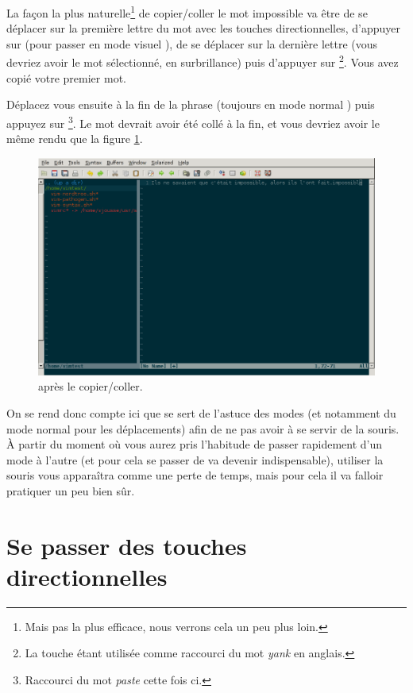La façon la plus naturelle\footnote{Mais pas la plus efficace, nous verrons cela un peu plus loin.} de copier/coller le mot \og impossible \fg{} va être de se déplacer sur la première lettre du mot avec les touches directionnelles, d'appuyer sur \ttv (pour passer en mode \og visuel \fg), de se déplacer sur la dernière lettre (vous devriez avoir le mot sélectionné, en surbrillance) puis d'appuyer sur \tty\footnote{La touche \ty étant utilisée comme raccourci du mot \emph{yank} en anglais.}. Vous avez copié votre premier mot.

Déplacez vous ensuite à la fin de la phrase (toujours en mode \og normal \fg) puis appuyez sur \ttp\footnote{Raccourci du mot \emph{paste} cette fois ci.}. Le mot devrait avoir été collé à la fin, et vous devriez avoir le même rendu que la figure \ref{fig:vim-paste}.

\begin{figure}%
  \includegraphics[width=\linewidth]{graphics/vim-paste.png}
  \caption{\vim après le copier/coller.}
  \label{fig:vim-paste}
\end{figure}

On se rend donc compte ici que \vim se sert de l'astuce des modes (et notamment du mode \og normal \fg{} pour les déplacements) afin de ne pas avoir à se servir de la souris.
À partir du moment où vous aurez pris l'habitude de passer rapidement d'un mode à l'autre (et pour cela se passer de \ttesc va devenir indispensable), utiliser la souris vous apparaîtra comme une perte de temps, mais pour cela il va falloir pratiquer un peu bien sûr.


\section{Se passer des touches directionnelles}\label{sec:se-passer-touches-dir}

